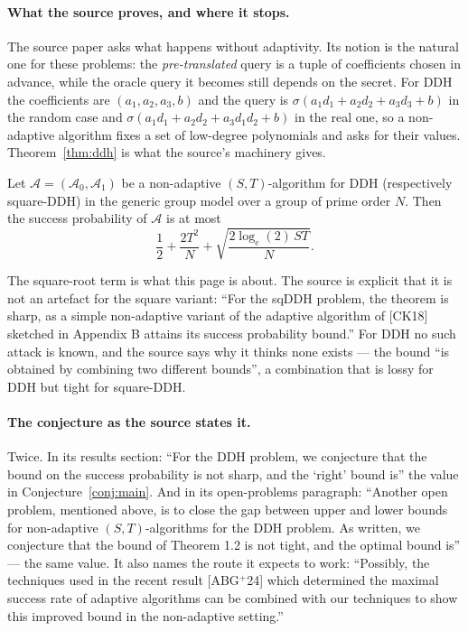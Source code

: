 \documentclass{aicr-conjecture}
\newcommand{\Adv}{\mathcal{A}}
\begin{document}
\paragraph{What the source proves, and where it stops.}
The source paper asks what happens without adaptivity. Its notion is
the natural one for these problems: the \emph{pre-translated} query is
a tuple of coefficients chosen in advance, while the oracle query it
becomes still depends on the secret. For DDH the coefficients are
$(a_{1}, a_{2}, a_{3}, b)$ and the query is
$\sigma(a_{1} d_{1} + a_{2} d_{2} + a_{3} d_{3} + b)$ in the random
case and
$\sigma(a_{1} d_{1} + a_{2} d_{2} + a_{3} d_{1} d_{2} + b)$ in the real
one, so a non-adaptive algorithm fixes a set of low-degree polynomials
and asks for their values. Theorem~\ref{thm:ddh} is what the source's
machinery gives.

\begin{theorem}\label{thm:ddh}
Let $\Adv = (\Adv_{0}, \Adv_{1})$ be a non-adaptive $(S,T)$-algorithm
for DDH (respectively square-DDH) in the generic group model over a
group of prime order $N$. Then the success probability of $\Adv$ is at
most
\[
  \frac{1}{2} + \frac{2T^{2}}{N}
  + \sqrt{\frac{2 \log_{e}(2) \, S T}{N}}.
\]
\end{theorem}

The square-root term is what this page is about. The source is explicit
that it is not an artefact for the square variant: ``For the sqDDH
problem, the theorem is sharp, as a simple non-adaptive variant of the
adaptive algorithm of [CK18] sketched in Appendix B attains its success
probability bound.'' For DDH no such attack is known, and the source
says why it thinks none exists --- the bound ``is obtained by combining
two different bounds'', a combination that is lossy for DDH but tight
for square-DDH\@.

\paragraph{The conjecture as the source states it.}
Twice. In its results section: ``For the DDH problem, we conjecture
that the bound on the success probability is not sharp, and the `right'
bound is'' the value in Conjecture~\ref{conj:main}. And in its
open-problems paragraph: ``Another open problem, mentioned above, is to
close the gap between upper and lower bounds for non-adaptive
$(S,T)$-algorithms for the DDH problem. As written, we conjecture that
the bound of Theorem 1.2 is not tight, and the optimal bound is''
--- the same value. It also names the route it expects to work:
``Possibly, the techniques used in the recent result [ABG$^{+}$24] which
determined the maximal success rate of adaptive algorithms can be
combined with our techniques to show this improved bound in the
non-adaptive setting.''
\end{document}
